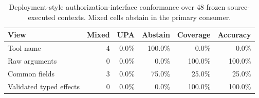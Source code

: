 \begin{table}[t]
\centering
\small
\caption{Deployment-style authorization-interface conformance over 48 frozen source-executed contexts. Mixed cells abstain in the primary consumer.}
\label{tab:deployment-authz-interface}
\begin{tabular}{lrrrrr}
\toprule
View & Mixed & UPA & Abstain & Coverage & Accuracy \\
\midrule
Tool name & 4 & 0.0\% & 100.0\% & 0.0\% & 0.0\% \\
Raw arguments & 0 & 0.0\% & 0.0\% & 100.0\% & 100.0\% \\
Common fields & 3 & 0.0\% & 75.0\% & 25.0\% & 25.0\% \\
Validated typed effects & 0 & 0.0\% & 0.0\% & 100.0\% & 100.0\% \\
\bottomrule
\end{tabular}
\end{table}

